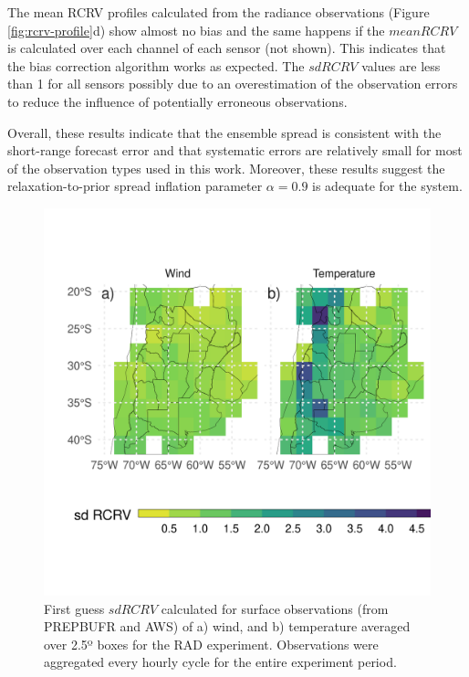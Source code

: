 \documentclass[preprint, 3p, authoryear,review, 12pt]{elsarticle} %
\begin{document}
The mean RCRV profiles calculated from the radiance observations (Figure \ref{fig:rcrv-profile}d) show almost no bias and the same happens if the \(mean RCRV\) is calculated over each channel of each sensor (not shown). This indicates that the bias correction algorithm works as expected. The \(sd RCRV\) values are less than 1 for all sensors possibly due to an overestimation of the observation errors to reduce the influence of potentially erroneous observations.

Overall, these results indicate that the ensemble spread is consistent with the short-range forecast error and that systematic errors are relatively small for most of the observation types used in this work. Moreover, these results suggest the relaxation-to-prior spread inflation parameter \(\alpha = 0.9\) is adequate for the system.



\begin{figure}
\includegraphics[width=1\linewidth]{../figures/rcrv-sfc-1} \caption{First guess \(sd RCRV\) calculated for surface observations (from PREPBUFR and AWS) of a) wind, and b) temperature averaged over 2.5º boxes for the RAD experiment. Observations were aggregated every hourly cycle for the entire experiment period.}\label{fig:rcrv-sfc}
\end{figure}
\end{document}
